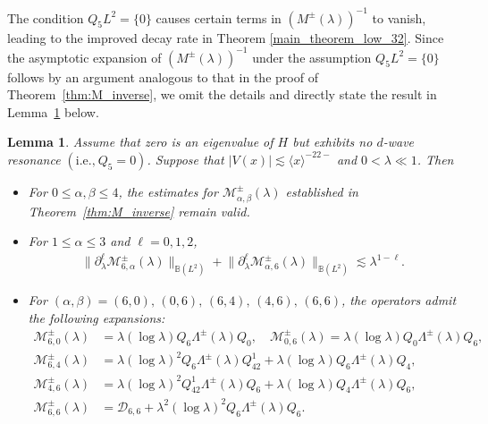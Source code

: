 \documentclass[reqno]{amsart}
\newtheorem{lemma}[theorem]{Lemma}
\numberwithin{equation}{section}
\begin{document}
The condition $Q_5 L^2 = \{0\}$ causes certain terms in $(M^\pm(\lambda))^{-1}$ to vanish, leading to the improved decay rate in Theorem \ref{main_theorem_low_32}.
Since the asymptotic expansion of $(M^\pm(\lambda))^{-1}$ under the assumption $Q_5 L^2 = \{0\}$ follows by an argument analogous to that in the proof of Theorem~\ref{thm:M_inverse}, we omit the details and directly state the result in Lemma~\ref{M_inverse_optimal} below.


\begin{lemma}\label{M_inverse_optimal}  
	Assume that zero is an eigenvalue of $H$ but exhibits no $d$-wave resonance $(\text{i.e.,}\  Q_5 = 0)$. Suppose that $|V(x)| \lesssim \langle x \rangle^{-22-}$ and $0<\lambda\ll1$. Then 
	\begin{itemize}  
		\item[(i)] For $0 \le \alpha, \beta \le 4$, the estimates for $\mathcal{M}_{\alpha,\beta}^\pm(\lambda)$ established in Theorem~\ref{thm:M_inverse} remain valid.
		
		\item[(ii)] For $1 \le \alpha \le 3$ and $\ell = 0,1,2$,  
		\begin{align}  \label{M6123}
		\bigl\|\partial_\lambda^{\ell} \mathcal{M}_{6,\alpha}^\pm(\lambda)\bigr\|_{\mathbb{B}(L^2)}  
		+ \bigl\|\partial_\lambda^{\ell} \mathcal{M}_{\alpha,6}^\pm(\lambda)\bigr\|_{\mathbb{B}(L^2)}  
		\lesssim \lambda^{1-\ell}.  
		\end{align}
		
		\item[(iii)] For $(\alpha,\beta) =(6,0),\,(0,6),\,(6,4),\,(4,6),\,(6,6)$, the operators admit the following expansions:  
		\[  
		\begin{aligned}  
			\mathcal{M}_{6,0}^{\pm}(\lambda) &= \lambda (\log \lambda)Q_6\Lambda^\pm(\lambda)Q_0, \quad 
			\mathcal{M}_{0,6}^{\pm}(\lambda) = \lambda (\log \lambda)Q_0\Lambda^\pm(\lambda)Q_6,  \\  
			\mathcal{M}_{6,4}^{\pm}(\lambda) &=  \lambda (\log \lambda)^2 Q_6 \Lambda^\pm(\lambda)Q_{42}^1+\lambda (\log \lambda) Q_6 \Lambda^\pm(\lambda)Q_4,\\
		\mathcal{M}_{4,6}^{\pm}(\lambda) &= \lambda (\log \lambda)^2 Q_{42}^1 \Lambda^\pm(\lambda)Q_{6} +\lambda (\log \lambda) Q_4 \Lambda^\pm(\lambda)Q_6, \\ 
		\mathcal{M}_{6,6}^{\pm}(\lambda) &= \mathcal{D}_{6,6}
			+  \lambda^2 (\log \lambda)^2Q_6 \Lambda^\pm(\lambda)Q_6.
		\end{aligned}  
		\]  
	\end{itemize}
	

\end{lemma}
\end{document}
